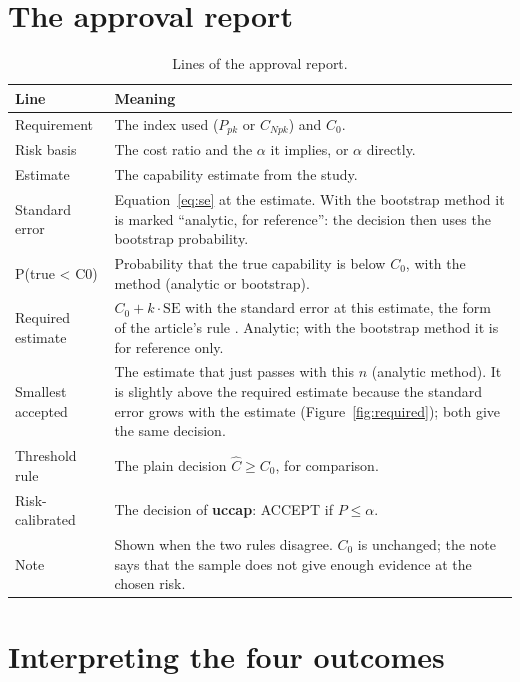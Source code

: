 \documentclass[a4paper,11pt,oneside,openany,parskip=half-,headings=standardclasses,toc=flat,numbers=noenddot]{scrbook}
\newcommand{\thead}[1]{{\sffamily\bfseries\footnotesize #1}}
\newcommand{\pkg}{\textsf{\bfseries uccap}}
\newcommand{\figref}[1]{Figure~\ref{#1}}
\begin{document}
\section{The approval report}

\begin{table}[H]
\caption{Lines of the approval report.}
\small
\begin{tabularx}{\textwidth}{@{}P{30mm}L@{}}
\toprule
\thead{Line} & \thead{Meaning}\\
\midrule
Requirement & The index used ($P_{pk}$ or $C_{Npk}$) and $C_0$.\\
Risk basis & The cost ratio and the $\alpha$ it implies, or $\alpha$ directly.\\
Estimate & The capability estimate from the study.\\
Standard error & Equation~\eqref{eq:se} at the estimate. With the bootstrap method it is marked ``analytic, for reference'': the decision then uses the bootstrap probability.\\
P(true < C0) & Probability that the true capability is below $C_0$, with the method (analytic or bootstrap).\\
Required estimate & $C_0 + k\cdot\mathrm{SE}$ with the standard error at this estimate, the form of the article's rule \cite[Eq.~(29)]{jy-risk}. Analytic; with the bootstrap method it is for reference only.\\
Smallest accepted & The estimate that just passes with this $n$ (analytic method). It is slightly above the required estimate because the standard error grows with the estimate (\figref{fig:required}); both give the same decision.\\
Threshold rule & The plain decision $\widehat C \ge C_0$, for comparison.\\
Risk-calibrated & The decision of \pkg{}: ACCEPT if $P \le \alpha$.\\
Note & Shown when the two rules disagree. $C_0$ is unchanged; the note says that the sample does not give enough evidence at the chosen risk.\\
\bottomrule
\end{tabularx}
\end{table}

\section{Interpreting the four outcomes}
\end{document}
